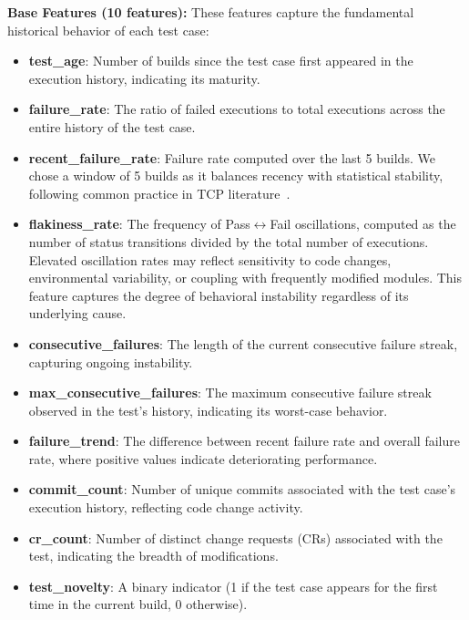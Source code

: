 \documentclass[10pt,journal,compsoc]{IEEEtran}
\begin{document}
\textbf{Base Features (10 features):} These features capture the fundamental
historical behavior of each test case:
\begin{itemize}
    \item \textbf{test\_age}: Number of builds since the test case first appeared
    in the execution history, indicating its maturity.
    \item \textbf{failure\_rate}: The ratio of failed executions to total
    executions across the entire history of the test case.
    \item \textbf{recent\_failure\_rate}: Failure rate computed over the last
    5 builds. We chose a window of 5 builds as it balances recency with
    statistical stability, following common practice in TCP
    literature~\cite{chen2023deeporder}.
    \item \textbf{flakiness\_rate}: The frequency of Pass$\leftrightarrow$Fail
    oscillations, computed as the number of status transitions divided by the
    total number of executions. Elevated oscillation rates may reflect
    sensitivity to code changes, environmental variability, or coupling with
    frequently modified modules. This feature captures the degree of
    behavioral instability regardless of its underlying cause.
    \item \textbf{consecutive\_failures}: The length of the current consecutive
    failure streak, capturing ongoing instability.
    \item \textbf{max\_consecutive\_failures}: The maximum consecutive failure
    streak observed in the test's history, indicating its worst-case behavior.
    \item \textbf{failure\_trend}: The difference between recent failure rate
    and overall failure rate, where positive values indicate deteriorating
    performance.
    \item \textbf{commit\_count}: Number of unique commits associated with
    the test case's execution history, reflecting code change activity.
    \item \textbf{cr\_count}: Number of distinct change requests (CRs)
    associated with the test, indicating the breadth of modifications.
    \item \textbf{test\_novelty}: A binary indicator (1 if the test case
    appears for the first time in the current build, 0 otherwise).
\end{itemize}
\end{document}
